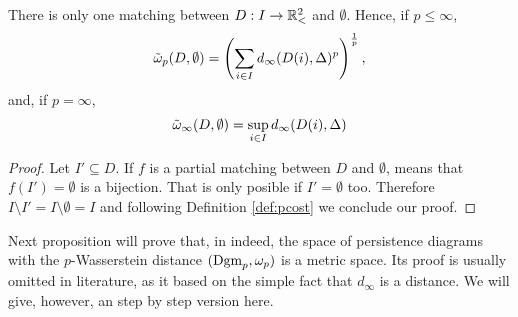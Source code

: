 \begin{proposition} \label{prop-empty-mathing-distance}
    There is only one matching between $ D: I \to \mathbb{R}_<^2 $ and $ \emptyset $. Hence, if $ p \leq \infty $,
    \begin{equation}
        \tilde \omega_p(D, \emptyset) = \left(\sum_{i\in I} d_\infty(D(i), \Delta)^p\right)^{\frac{1}{p}},
    \end{equation}
    and, if $ p = \infty $,
    \begin{equation}
        \tilde \omega_\infty(D, \emptyset) = \sup_{i\in I} d_\infty(D(i), \Delta)
    \end{equation}
\end{proposition}
\begin{proof}
    Let $ I' \subseteq D $. If $ f $ is a partial matching between $ D $ and $ \emptyset $, means that $ f(I') = \emptyset$ is a bijection. That is only posible if $ I' = \emptyset $ too. Therefore $ I \setminus I' = I \setminus \emptyset = I $ and following Definition \ref{def:pcost} we conclude our proof.
\end{proof}

Next proposition will prove that, in indeed, the space of persistence diagrams with the $p$-Wasserstein distance $(\operatorname{Dgm}_p, \omega_p)$ is a metric space. Its proof is usually omitted in literature, as it based on the simple fact that $ d_\infty $ is a distance. We will give, however, an step by step version here.

